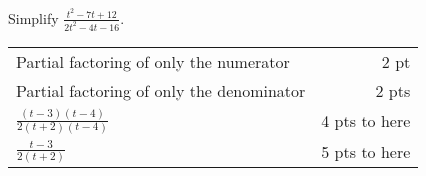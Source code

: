 
{
	Simplify $\displaystyle \frac{t^2-7t+12}{2t^2-4t-16}$.
}
{
	\begin{tabular}{l r}
	Partial factoring of only the numerator & 2 pt\\
	Partial factoring of only the denominator & 2 pts\\
	$\displaystyle \frac{(t-3)(t-4)}{2(t+2)(t-4)}$ & 4 pts to here\\[10pt]
	$\displaystyle \frac{t-3}{2(t+2)}$ & 5 pts to here\\
	\end{tabular}
}
